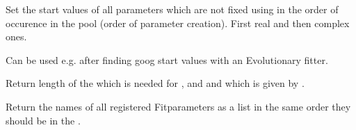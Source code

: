 \documentclass[letterpaper,10pt,english]{sphinxmanual}
\begin{document}
\begin{fulllineitems}
\begin{fulllineitems}
\end{fulllineitems}


\begin{fulllineitems}
\label{\detokenize{modules-api/parameters:Parameters.ParameterPool.setStartValues}}
Set the start values of all parameters which are not fixed using  in the order of occurence in the pool (order of parameter creation). First real and then complex ones.

Can be used e.g. after finding goog start values with an Evolutionary fitter.

\end{fulllineitems}


\begin{fulllineitems}
\label{\detokenize{modules-api/parameters:Parameters.ParameterPool.getFitArrayLen}}
Return length of the  which is needed for {\hyperref[\detokenize{modules-api/parameters:Parameters.ParameterPool.setStartValues}]{}}, {\hyperref[\detokenize{modules-api/parameters:Parameters.ParameterPool.writeToFile}]{}} and {\hyperref[\detokenize{modules-api/parameters:Parameters.Fitparameter.getValue}]{}} and which is given by {\hyperref[\detokenize{modules-api/parameters:Parameters.ParameterPool.getStartLowerUpper}]{}}.

\end{fulllineitems}


\begin{fulllineitems}
\label{\detokenize{modules-api/parameters:Parameters.ParameterPool.getNames}}
Return the names of all registered Fitparameters as a list in the same order they should be in the .

\end{fulllineitems}


\end{fulllineitems}
\end{document}
